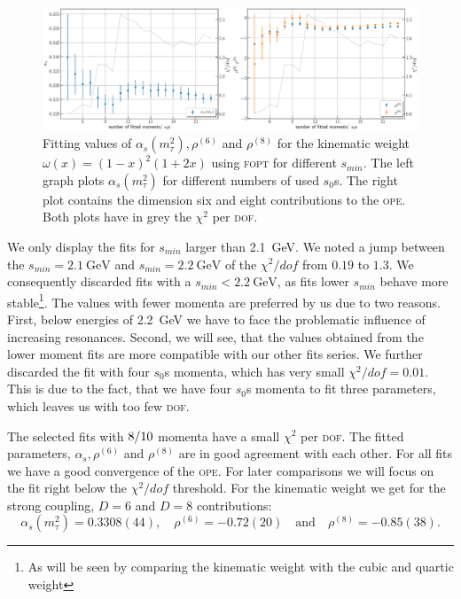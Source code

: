 \documentclass[../../index.tex]{subfiles}
\begin{document}
\begin{figure}
  \centering \includegraphics[width=\textwidth]{./images/fitWKinAlD6D8.eps}
  \caption{Fitting values of \(\alpha_s(m_\tau^2), \rho^{(6)}\) and
    \(\rho^{(8)}\) for the kinematic weight \(\omega(x)=(1-x)^2(1+2x)\) using
    \textsc{fopt} for different \(s_{min}\). The left graph plots
    \(\alpha_s(m_\tau^2)\) for different numbers of used \(s_0\)s. The right
    plot contains the dimension six and eight contributions to the \textsc{ope}.
    Both plots have in grey the \(\chi^2\) per \textsc{dof}.}
  \label{fig:fitWKinAlD6D8}
\end{figure}

We only display the fits for \(s_{min}\) larger than \SI{2.1}{\giga\eV}. We
noted a jump between the \(s_{min}=\SI{2.1}{\giga\eV}\) and
\(s_{min}=\SI{2.2}{\giga\eV}\) of the \(\chi^2/dof\) from \(0.19\) to \(1.3\).
We consequently discarded fits with a \(s_{min}<\SI{2.2}{\giga\eV}\), as fits
lower \(s_{min}\) behave more stable\footnote{As will be seen by comparing the
  kinematic weight with the cubic and quartic weight}. The values with fewer
momenta are preferred by us due to two reasons. First, below energies of
\SI{2.2}{\giga\eV} we have to face the problematic influence of increasing
resonances. Second, we will see, that the values obtained from the lower moment
fits are more compatible with our other fits series. We further discarded the
fit with four \(s_0\)s momenta, which has very small \(\chi^2/dof=0.01\). This
is due to the fact, that we have four \(s_0\)s momenta to fit three parameters,
which leaves us with too few \textsc{dof}.

The selected fits with \(8\-/10\) momenta have a small \(\chi^2\) per
\textsc{dof}. The fitted parameters, \(\alpha_s, \rho^{(6)}\) and \(\rho^{(8)}\)
are in good agreement with each other. For all fits we have a good convergence
of the \textsc{ope}. For later comparisons we will focus on the fit right below
the \(\chi^2/dof\) threshold. For the kinematic weight we get for the strong
coupling, \(D=6\) and \(D=8\) contributions:
\begin{equation}
  \label{eq:wKinResult}
  \alpha_s(m_\tau^2) = 0.3308(44), \quad \rho^{(6)} = -0.72(20) \quad \text{and} \quad
  \rho^{(8)} = -0.85(38).
\end{equation}
\end{document}

